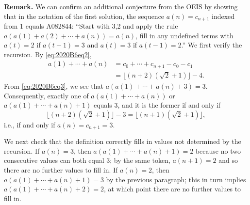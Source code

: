 \documentclass[amssymb,twocolumn,pra,10pt,aps]{revtex4-1}
\begin{document}
\begin{itemize}
\noindent
\textbf{Remark.}
We can confirm an additional conjecture from the OEIS by showing that in the notation of the first solution,
the sequence $a(n) = c_{n+1}$ indexed from 1 equals
A082844: ``Start with 3,2 and apply the rule $a(a(1)+a(2)+\cdots+a(n)) = a(n)$, fill in any undefined terms with $a(t) = 2$ if $a(t-1) = 3$ and $a(t) = 3$ if $a(t-1) = 2$.'' We first verify the recursion. By \eqref{eq:2020B6eq2},
\begin{align*}
a(1) + \cdots + a(n) &= c_0 + \cdots + c_{n+1} - c_0 - c_1 \\
&= \lfloor (n+2)(\sqrt{2}+1) \rfloor - 4.
\end{align*}
From \eqref{eq:2020B6eq3}, we see that
$a(a(1) + \cdots + a(n)+3) = 3$. Consequently,
exactly one of $a(a(1) + \cdots + a(n))$ or $a(a(1) + \cdots + a(n)+1)$ equals 3,
and it is the former if and only if
\[
\lfloor (n+2)(\sqrt{2}+1) \rfloor - 3 = \lfloor (n+1)(\sqrt{2}+1) \rfloor,
\]
i.e., if and only if $a(n) = c_{n+1} = 3$.

We next check that the definition correctly fills in values not determined by the recursion. If 
$a(n) = 3$, then $a(a(1) + \cdots + a(n)+1) = 2$ because no two consecutive values can both equal 3;
by the same token, $a(n+1) = 2$ and so there are no further values to fill in. If $a(n) = 2$, then $a(a(1) + \cdots + a(n)+1) = 3$ by the previous paragraph;
this in turn implies $a(a(1) + \cdots + a(n)+2) = 2$, at which point there are no further values to fill in.


\end{itemize}
\end{document}
